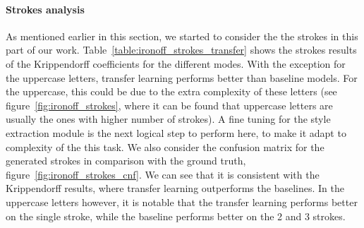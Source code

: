     \paragraph{Strokes analysis}
    As mentioned earlier in this section, we started to consider the the strokes in this part of our work. Table~\ref{table:ironoff_strokes_transfer} shows the strokes results of the Krippendorff coefficients for the different modes. With the exception for the uppercase letters, transfer learning performs better than baseline models. For the uppercase, this could be due to the extra complexity of these letters (see figure~\ref{fig:ironoff_strokes}, where it can be found that uppercase letters are usually the ones with higher number of strokes). A fine tuning for the style extraction module is the next logical step to perform here, to make it adapt to complexity of the this task. We also consider the confusion matrix for the generated strokes in comparison with the ground truth, figure~\ref{fig:ironoff_strokes_cnf}. We can see that it is consistent with the Krippendorff results, where transfer learning outperforms the baselines. In the uppercase letters however, it is notable that the transfer learning performs better on the single stroke, while the baseline performs better on the 2 and 3 strokes.

